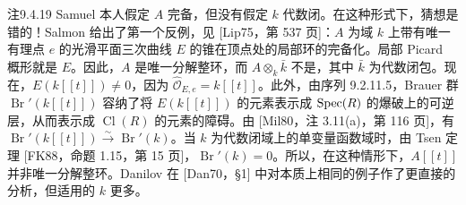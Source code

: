 \begin{origstatement}{注}{9.4.19}
Samuel 本人假定 $A$ 完备，但没有假定 $k$ 代数闭。在这种形式下，猜想是错的！Salmon 给出了第一个反例，见 [Lip75，第 537 页]：$A$ 为域 $k$ 上带有唯一有理点 $e$ 的光滑平面三次曲线 $E$ 的锥在顶点处的局部环的完备化。局部 Picard 概形就是 $E$。因此，$A$ 是唯一分解整环，而 $A\otimes_k\bar k$ 不是，其中 $\bar k$ 为代数闭包。现在，$E(k[[t]])\ne0$，因为 $\widehat{\mathcal O}_{E,e}=k[[t]]$。此外，由序列 9.2.11.5，Brauer 群 $\operatorname{Br}'(k[[t]])$ 容纳了将 $E(k[[t]])$ 的元素表示成 $\operatorname{Spec}(R)$ 的爆破上的可逆层，从而表示成 $\operatorname{Cl}(R)$ 的元素的障碍。由 [Mil80，注 3.11(a)，第 116 页]，有 $\operatorname{Br}'(k[[t]])\xrightarrow{\sim}\operatorname{Br}'(k)$。当 $k$ 为代数闭域上的单变量函数域时，由 Tsen 定理 [FK88，命题 1.15，第 15 页]，$\operatorname{Br}'(k)=0$。所以，在这种情形下，$A[[t]]$ 并非唯一分解整环。Danilov 在 [Dan70，§1] 中对本质上相同的例子作了更直接的分析，但适用的 $k$ 更多。
\end{origstatement}
\endgroup
